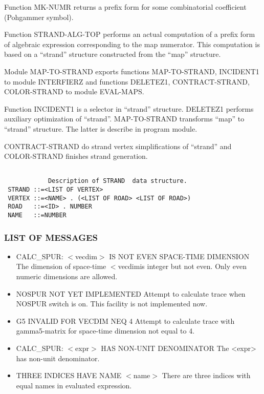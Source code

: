Function MK-NUMR returns a prefix form for some combinatorial
coefficient (Pohgammer symbol).

Function STRAND-ALG-TOP performs an actual computation of a prefix
form of algebraic expression corresponding to the map numerator. This
computation is based on a ``strand'' structure constructed from the
``map'' structure.

Module MAP-TO-STRAND exports functions MAP-TO-STRAND, INCIDENT1 to
module INTERFIERZ and functions DELETEZ1, CONTRACT-STRAND,
COLOR-STRAND to module EVAL-MAPS.

Function INCIDENT1 is a selector in ``strand'' structure.  DELETEZ1
performs auxiliary optimization of ``strand''.  MAP-TO-STRAND transforms
``map'' to ``strand'' structure.  The latter is describe in program
module.

CONTRACT-STRAND do strand vertex simplifications of ``strand'' and
COLOR-STRAND finishes strand generation.

\begin{verbatim}

            Description of STRAND  data structure.
 STRAND ::=<LIST OF VERTEX>
 VERTEX ::=<NAME> . (<LIST OF ROAD> <LIST OF ROAD>)
 ROAD   ::=<ID> . NUMBER
 NAME   ::=NUMBER
\end{verbatim}


\subsubsection*{ LIST OF MESSAGES}

\begin{itemize}

\item{CALC\_SPUR: $<$vecdim$>$ IS NOT EVEN SPACE-TIME DIMENSION}
 The dimension of space-time $<$vecdim$ $is integer but not
even. Only even numeric dimensions are allowed.

\item{NOSPUR NOT YET IMPLEMENTED}
 Attempt to calculate trace when NOSPUR switch is on.  This facility
is not implemented now.

\item{G5 INVALID FOR VECDIM NEQ 4}
 Attempt to calculate trace with gamma5-matrix for space-time
dimension not equal to 4.

\item{CALC\_SPUR: $<$expr$>$ HAS NON-UNIT DENOMINATOR}
The <expr> has non-unit denominator.

\item{THREE INDICES HAVE NAME $<$name$>$}
 There are three indices with equal names in evaluated expression.

\end{itemize}

